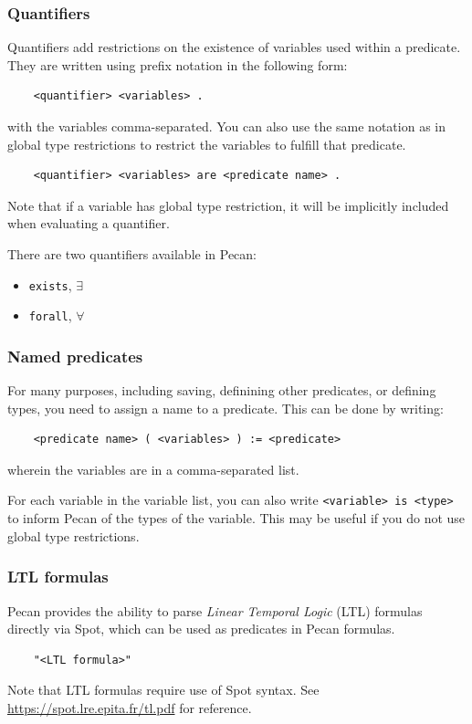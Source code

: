 \documentclass{report}
\begin{document}
\subsubsection{Quantifiers}
Quantifiers add restrictions on the existence of variables used within a predicate.
They are written using prefix notation in the following form:
\begin{verbatim}
    <quantifier> <variables> .
\end{verbatim}
with the variables comma-separated.
You can also use the same notation as in global type restrictions to restrict the variables to fulfill that predicate.
\begin{verbatim}
    <quantifier> <variables> are <predicate name> .
\end{verbatim}
Note that if a variable has global type restriction, it will be implicitly included when evaluating a quantifier.

There are two quantifiers available in Pecan:
\begin{itemize}
    \item \verb+exists+, \(\exists\)
    \item \verb+forall+, \(\forall\)
\end{itemize}

\subsubsection{Named predicates}
For many purposes, including saving, definining other predicates, or defining types, you need to assign a name to a predicate.
This can be done by writing:
\begin{verbatim}
    <predicate name> ( <variables> ) := <predicate>
\end{verbatim}
wherein the variables are in a comma-separated list.

For each variable in the variable list, you can also write \verb+<variable> is <type>+ to inform Pecan of the types of the variable.
This may be useful if you do not use global type restrictions.

\subsubsection{LTL formulas}
Pecan provides the ability to parse \emph{Linear Temporal Logic} (LTL) formulas directly via Spot, which can be used as predicates in Pecan formulas.
\begin{verbatim}
    "<LTL formula>"
\end{verbatim}
Note that LTL formulas require use of Spot syntax.
See \href{https://spot.lre.epita.fr/tl.pdf}{https://spot.lre.epita.fr/tl.pdf} for reference.
\end{document}
